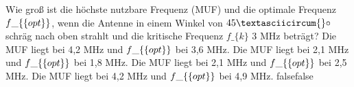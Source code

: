     {Wie groß ist die höchste nutzbare Frequenz (MUF) und die optimale Frequenz $f\_\{\textrm\{opt\}\}$, wenn die Antenne in einem Winkel von $45\textasciicircum{}\circ$ schräg nach oben strahlt und die kritische Frequenz $f\_\{k\}$ 3 MHz beträgt?}
    {Die MUF liegt bei 4,2 MHz und $f\_\{\textrm\{opt\}\}$ bei 3,6 MHz.}
    {Die MUF liegt bei 2,1 MHz und $f\_\{\textrm\{opt\}\}$ bei 1,8 MHz.}
    {Die MUF liegt bei 2,1 MHz und $f\_\{\textrm\{opt\}\}$ bei 2,5 MHz.}
    {Die MUF liegt bei 4,2 MHz und $f\_\{\textrm\{opt\}\}$ bei 4,9 MHz.}
    {false}{false}